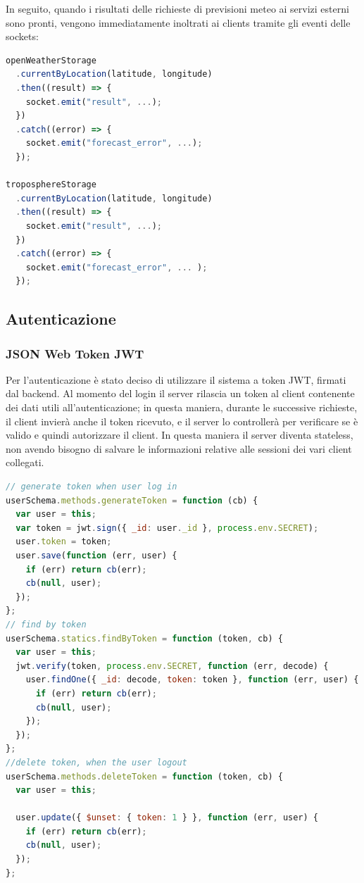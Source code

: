 In seguito, quando i risultati delle richieste di previsioni meteo ai servizi esterni sono pronti, vengono immediatamente inoltrati ai clients tramite gli eventi delle sockets:

\begin{lstlisting}[language=Javascript]
openWeatherStorage
  .currentByLocation(latitude, longitude)
  .then((result) => {
    socket.emit("result", ...);
  })
  .catch((error) => {
    socket.emit("forecast_error", ...);
  });
  
troposphereStorage
  .currentByLocation(latitude, longitude)
  .then((result) => {
    socket.emit("result", ...);
  })
  .catch((error) => {
    socket.emit("forecast_error", ... );
  });
\end{lstlisting}

\subsection{Autenticazione}

\subsubsection{JSON Web Token JWT}
Per l'autenticazione è stato deciso di utilizzare il sistema a token JWT, firmati dal backend. Al momento
del login il server rilascia un token al client contenente dei dati
utili all’autenticazione; in questa maniera, durante le successive richieste,
il client invierà anche il token ricevuto, e il server lo controllerà per verificare
se è valido e quindi autorizzare il client. In questa maniera il server
diventa stateless, non avendo bisogno di salvare le informazioni relative
alle sessioni dei vari client collegati.


\begin{lstlisting}[language=Javascript]
// generate token when user log in
userSchema.methods.generateToken = function (cb) {
  var user = this;
  var token = jwt.sign({ _id: user._id }, process.env.SECRET);
  user.token = token;
  user.save(function (err, user) {
    if (err) return cb(err);
    cb(null, user);
  });
};
// find by token
userSchema.statics.findByToken = function (token, cb) {
  var user = this;
  jwt.verify(token, process.env.SECRET, function (err, decode) {
    user.findOne({ _id: decode, token: token }, function (err, user) {
      if (err) return cb(err);
      cb(null, user);
    });
  });
};
//delete token, when the user logout
userSchema.methods.deleteToken = function (token, cb) {
  var user = this;

  user.update({ $unset: { token: 1 } }, function (err, user) {
    if (err) return cb(err);
    cb(null, user);
  });
};

\end{lstlisting}

